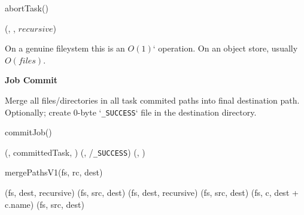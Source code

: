 \documentclass[conference]{IEEEtran}
\newcommand{\SUCCESS}{\texttt{\_SUCCESS}}
\begin{document}
\begin{procedure}
\caption{abortTask()}

  \delete(\fs, \taskAttemptPath, $recursive$)\;
\end{procedure}


On a genuine fileystem this is an $O(1)$` operation.
On an object store, usually $O(files)$.


\textbf{Job Commit}

Merge all files/directories in all task commited paths into final destination path.
Optionally;
create 0-byte `\SUCCESS` file in the destination directory.

\begin{procedure*}
  \caption{commitJob()}

   {
    \mergePaths(\fs, committedTask, \dest)\;
  }
  \touch(\fs, \dest/\SUCCESS)\;
  \delete(\fs, \temp)\;
\end{procedure*}

\begin{procedure*}
\label{alg:mergePathsV1}
\caption{mergePathsV1(fs, rc, dest)}


 {
   {
    \delete(fs, dest, recursive)\;
  }
  \rename(fs, src, dest)\;
} {
   {
     {
      \delete(fs, dest, recursive)\;
      \rename(fs, src, dest)\;
    } {
       {
       \mergePaths(fs, c, dest + c.name)\;
      }
    }
  }{
   \rename(fs, src, dest)\;
  }
}

\end{procedure*}
\end{document}
